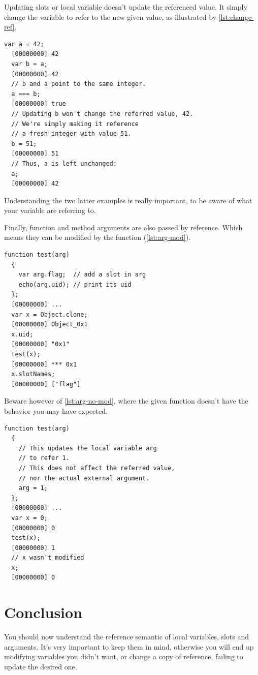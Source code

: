 \documentclass[openright,twoside,12pt]{report}
\newcommand{\lst}[1]{\autoref{lst:#1}}
\begin{document}
Updating slots or local variable doesn't update the referenced
value. It simply change the variable to refer to the new given value,
as illustrated by \lst{change-ref}.

\begin{lstlisting}[caption=Updates just change the referee,
  label=lst:change-ref]
  var a = 42;
  [00000000] 42
  var b = a;
  [00000000] 42
  // b and a point to the same integer.
  a === b;
  [00000000] true
  // Updating b won't change the referred value, 42.
  // We're simply making it reference
  // a fresh integer with value 51.
  b = 51;
  [00000000] 51
  // Thus, a is left unchanged:
  a;
  [00000000] 42
\end{lstlisting}

Understanding the two latter examples is really important, to be aware
of what your variable are referring to.

Finally, function and method arguments are also passed by
reference. Which means they can be modified by the function
(\lst{arg-mod}).

\begin{lstlisting}[caption=Function modifying its argument,
  label=lst:arg-mod]
  function test(arg)
  {
    var arg.flag;  // add a slot in arg
    echo(arg.uid); // print its uid
  };
  [00000000] ...
  var x = Object.clone;
  [00000000] Object_0x1
  x.uid;
  [00000000] "0x1"
  test(x);
  [00000000] *** 0x1
  x.slotNames;
  [00000000] ["flag"]
\end{lstlisting}

Beware however of \lst{arg-no-mod}, where the given function doesn't
have the behavior you may have expected.

\begin{lstlisting}[caption=Function failing to modify its argument,
  label=lst:arg-no-mod]
  function test(arg)
  {
    // This updates the local variable arg
    // to refer 1.
    // This does not affect the referred value,
    // nor the actual external argument.
    arg = 1;
  };
  [00000000] ...
  var x = 0;
  [00000000] 0
  test(x);
  [00000000] 1
  // x wasn't modified
  x;
  [00000000] 0
\end{lstlisting}

\section{Conclusion}

You should now understand the reference semantic of local variables,
slots and arguments. It's very important to keep them in mind,
otherwise you will end up modifying variables you didn't want, or
change a copy of reference, failing to update the desired one.
\end{document}
